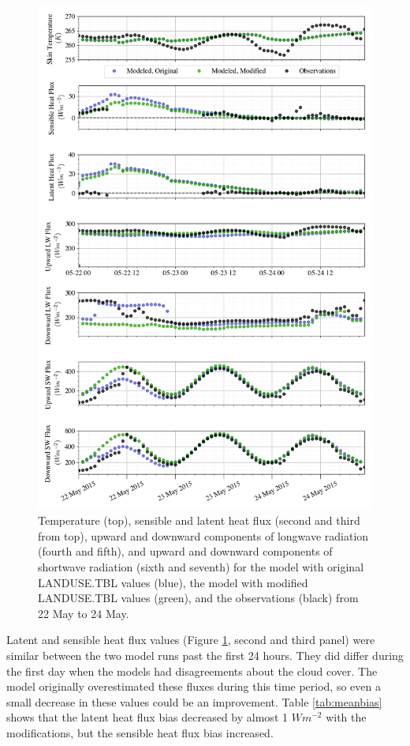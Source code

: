\begin{figure}[p]
    \centering
        \vspace*{-2cm}
    \includegraphics[width=0.9\linewidth]{figures/chapter6/case3_all_new.png}
    \caption[Idealized Case 3]{Temperature (top), sensible and latent heat flux (second and third from top), upward and downward components of longwave radiation (fourth and fifth), and upward and downward components of shortwave radiation (sixth and seventh) for the model with original LANDUSE.TBL values (blue), the model with modified LANDUSE.TBL values (green), and the observations (black) from 22 May to 24 May.}
    \label{fig:c3}
\end{figure}

Latent and sensible heat flux values (Figure \ref{fig:c3}, second and third panel) were similar between the two model runs past the first 24 hours. They did differ during the first day when the models had disagreements about the cloud cover. The model originally overestimated these fluxes during this time period, so even a small decrease in these values could be an improvement. Table \ref{tab:meanbias} shows that the latent heat flux bias decreased by almost 1 $Wm^{-2}$ with the modifications, but the sensible heat flux bias increased. 

